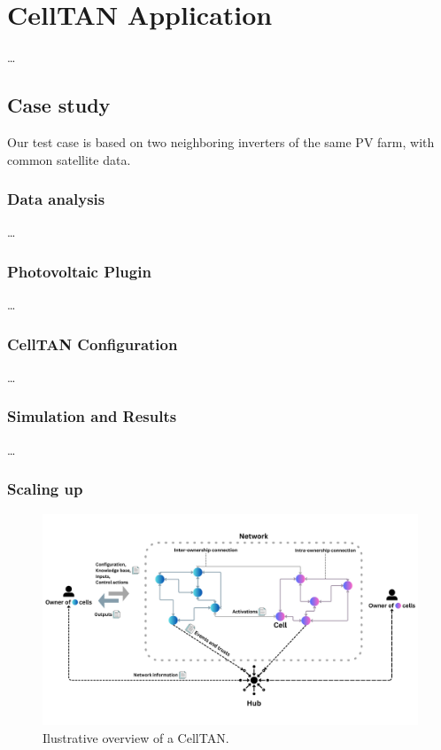 \chapter{CellTAN Application} \label{chap:chap5}

\dots

\section{Case study}

Our test case is based on two neighboring inverters of the same PV farm, with common satellite data.

\subsection{Data analysis}

\dots

\subsection{Photovoltaic Plugin}

\dots

\subsection{CellTAN Configuration}

\dots

\subsection{Simulation and Results}

\dots

\subsection{Scaling up}

\begin{figure}[h!]
    \centering
    \includegraphics[width=\linewidth]{figures/chapter4/cell/celltan.pdf}
    \caption{Ilustrative overview of a CellTAN.}
    \label{fig:celltan}
\end{figure}

